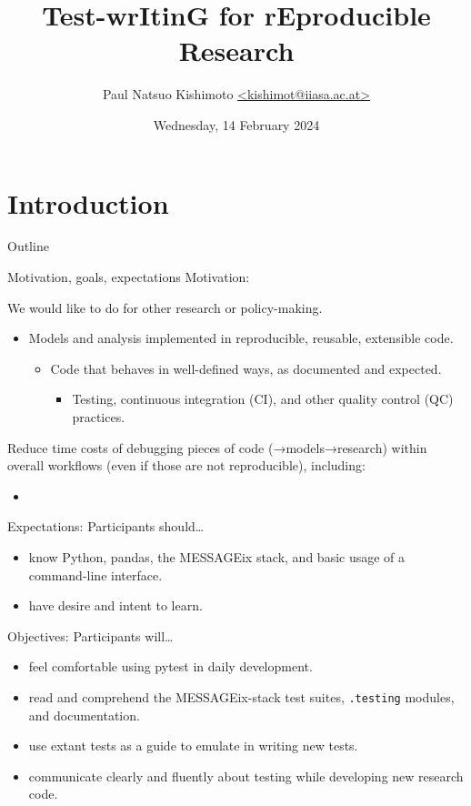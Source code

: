 \documentclass[12pt,aspectratio=169]{beamer}
\title{Test-wrItinG for rEproducible Research \emoji{tiger}}
\institute{IIASA Energy, Climate, and Environment program}
\date{Wednesday, 14 February 2024}
\author{\texorpdfstring{Paul Natsuo Kishimoto \scriptsize\newline
  \href{mailto:kishimot@iiasa.ac.at}%
       {\ttfamily <kishimot@iiasa.ac.at>}}%
  {Paul Natsuo Kishimoto <kishimot@iiasa.ac.at>}}
\renewcommand{\mod}[1]{\texttt{#1}}
\begin{document}
\maketitle

\section{Introduction}
\begin{frame}{Outline}
  \tableofcontents
\end{frame}

\begin{frame}[allowframebreaks]{Motivation, goals, expectations}
Motivation:

\bigskip
We would like to do  for other research or policy-making.
\begin{itemize}
  \item Models and analysis implemented in reproducible, reusable, extensible code.
  \begin{itemize}
    \item Code that behaves in well-defined ways, as documented and expected.
    \begin{itemize}
       \item Testing, continuous integration (CI), and other quality control (QC) practices.
    \end{itemize}
  \end{itemize}
\end{itemize}

\pause
Reduce time costs of debugging pieces of code (→models→research) within overall workflows (even if those are not reproducible), including:
\begin{itemize}
    \item 
\end{itemize}

\framebreak
Expectations: Participants should…
\begin{itemize}
  \item know Python, pandas, the MESSAGEix stack, and basic usage of a command-line interface.
  \item have desire and intent to learn.
\end{itemize}

\medskip
Objectives: Participants will…
\begin{itemize}
  \item feel comfortable using pytest in daily development.
  \item read and comprehend the MESSAGEix-stack test suites, \mod{.testing} modules, and documentation.
  \item use extant tests as a guide to emulate in writing new tests.
  \item communicate clearly and fluently about testing while developing new research code.
\end{itemize}
\end{frame}
\end{document}
